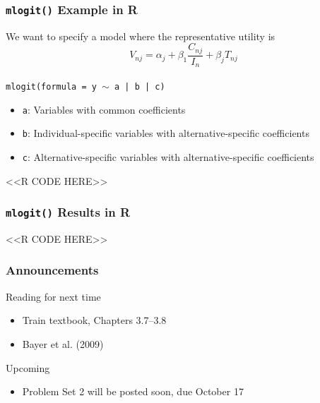 \documentclass{beamer}
\begin{document}
\begin{frame}[fragile]\frametitle{\texttt{mlogit()} Example in R}
    We want to specify a model where the representative utility is
    $$V_{nj} = \alpha_j + \beta_1 \frac{C_{nj}}{I_n} + \beta_j T_{nj}$$ \\
    \vspace{2ex}
    \texttt{mlogit(formula = y $\sim$ a | b | c)}
    \begin{itemize}
    	\item \texttt{a}: Variables with common coefficients
    	\item \texttt{b}: Individual-specific variables with alternative-specific coefficients
    	\item \texttt{c}: Alternative-specific variables with alternative-specific coefficients
    \end{itemize}
    \vspace{2ex}
    <<R CODE HERE>>
\end{frame}

\begin{frame}[fragile]\frametitle{\texttt{mlogit()} Results in R}
    <<R CODE HERE>>
\end{frame}

\begin{frame}\frametitle{Announcements}
    Reading for next time
    \begin{itemize}
        \item Train textbook, Chapters 3.7--3.8
        \item Bayer et al. (2009)
    \end{itemize}
    \vspace{3ex}
    Upcoming
    \begin{itemize}
        \item Problem Set 2 will be posted soon, due October 17
    \end{itemize}
\end{frame}
\end{document}
